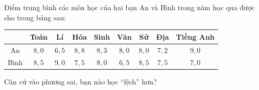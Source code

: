 \begin{ex}
Điểm trung bình các môn học của hai bạn An và Bình trong năm học qua được cho trong bảng sau:
\begin{center}
\begin{tabular}{|c|c|c|c|c|c|c|c|c|}\hline
 & Toán & Lí & Hóa & Sinh & Văn & Sử & Địa & Tiếng Anh\\\hline
An & $8{,}0$ & $6{,}5$ & $8{,}8$ & $8{,}3$ & $8{,}0$ & $8{,}0$ & $7{,}2$ & $9{,}0$\\\hline
Bình & $8{,}5$ & $9{,}0$ & $7{,}5$ & $8{,}0$ & $6{,}5$ & $8{,}5$ & $7{,}5$ & $7{,}0$\\\hline
\end{tabular}
\end{center}
Căn cứ vào phương sai, bạn nào học ``lệch'' hơn?
\end{ex}
